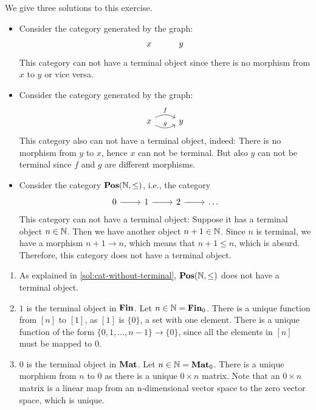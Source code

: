 \begin{solution}\label{sol:cat-without-terminal}
We give three solutions to this exercise.
\begin{itemize}
\item Consider the category generated by the graph: 
\[
\begin{tikzcd}
x & y
\end{tikzcd}
\]
This category can not have a terminal object since there is no morphism from $x$ to $y$ or vice versa.
\item Consider the category generated by the graph: 
\[
\begin{tikzcd}
x \arrow[r, bend left, "f"] \arrow[r, bend right, "g"] & y
\end{tikzcd}
\]
This category also can not have a terminal object, indeed: There is no morphism from $y$ to $x$, hence $x$ can not be terminal. But also $y$ can not be terminal since $f$ and $g$ are different morphisms.
\item Consider the category $ \mathbf{Pos}(\mathbb{N}, \leq) $, i.e., the category
\[
\begin{tikzcd}
	0 \arrow[r] & 1 \arrow[r] & 2 \arrow[r] & \dots
\end{tikzcd}
\]
This category can not have a terminal object: Suppose it has a terminal object $ n \in \mathbb{N} $. Then we have another object $ n + 1 \in \mathbb{N} $. Since $ n $ is terminal, we have a morphism $ n + 1 \to n $, which means that $ n + 1 \leq n $, which is absurd. Therefore, this category does not have a terminal object.
\end{itemize}
\end{solution}

\begin{solution}\label{sol:terminal_cats_of_nats}
	\begin{enumerate}
		\item As explained in \cref{sol:cat-without-terminal}, $\mathbf{Pos}(\mathbb{N},\leq)$ does not have a terminal object.
		\item $1$ is the terminal object in $\mathbf{Fin}$. Let $n \in \mathbb{N} = \mathbf{Fin}_0$. There is a unique function from $[n]$ to $[1]$, as $[1]$ is $\{0\}$, a set with one element. There is a unique function of the form $\{0, 1, \dots, n-1\} \to \{ 0 \}$, since all the elements in $[n]$ must be mapped to $0$.
		\item $0$ is the terminal object in $\mathbf{Mat}$. Let $n \in \mathbb{N} = \mathbf{Mat}_0$. There is a unique morphism from $n$ to $0$ as there is a unique $0 \times n$ matrix. 
		Note that an $0 \times n$ matrix is a linear map from an n-dimensional vector space to the zero vector space, which is unique.
	\end{enumerate}
\end{solution}

